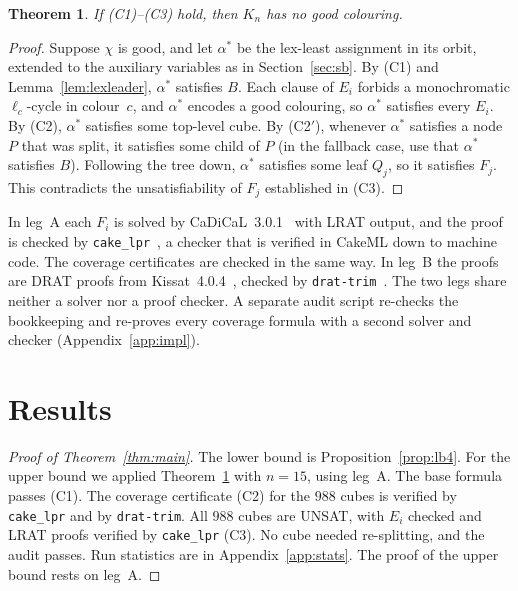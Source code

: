 \documentclass[11pt]{amsart}
\newtheorem{theorem}{Theorem}
\theoremstyle{definition}
\theoremstyle{remark}
\begin{document}
\begin{theorem}\label{thm:cert}
If (C1)--(C3) hold, then $K_n$ has no good colouring.
\end{theorem}
\begin{proof}
Suppose $\chi$ is good, and let $\alpha^*$ be the lex-least assignment in its orbit, extended to the auxiliary variables as in
Section~\ref{sec:sb}. By (C1) and Lemma~\ref{lem:lexleader}, $\alpha^*$ satisfies $B$. Each clause of $E_i$ forbids a monochromatic
$\ell_c$-cycle in colour~$c$, and $\alpha^*$ encodes a good colouring, so $\alpha^*$ satisfies every $E_i$. By (C2), $\alpha^*$
satisfies some top-level cube. By (C2$'$), whenever $\alpha^*$ satisfies a node $P$ that was split, it satisfies some child of $P$ (in the
fallback case, use that $\alpha^*$ satisfies $B$). Following the tree down, $\alpha^*$ satisfies some leaf $Q_j$, so it satisfies $F_j$. This contradicts the unsatisfiability of $F_j$ established in (C3).
\end{proof}

In leg~A each $F_i$ is solved by CaDiCaL~3.0.1~\cite{CaDiCaL2} with LRAT output, and the proof is checked by
\texttt{cake\_lpr}~\cite{cakelpr}, a checker that is verified in CakeML down to machine code. The coverage certificates are checked in
the same way. In leg~B the proofs are DRAT proofs from Kissat~4.0.4~\cite{Kissat24}, checked by \texttt{drat-trim}~\cite{DRATtrim}.
The two legs share neither a solver nor a proof checker. A separate audit script re-checks the bookkeeping and re-proves every
coverage formula with a second solver and checker (Appendix~\ref{app:impl}).

\section{Results}\label{sec:results}

\begin{proof}[Proof of Theorem~\ref{thm:main}]
The lower bound is Proposition~\ref{prop:lb4}. For the upper bound we applied Theorem~\ref{thm:cert} with $n=15$, using leg~A. The base
formula passes (C1). The coverage certificate (C2) for the $988$ cubes is verified by \texttt{cake\_lpr} and by \texttt{drat-trim}. All
$988$ cubes are UNSAT, with $E_i$ checked and LRAT proofs verified by \texttt{cake\_lpr} (C3). No cube needed re-splitting, and the
audit passes. Run statistics are in Appendix~\ref{app:stats}. The proof of the upper bound rests on leg~A.
\end{proof}
\end{document}
